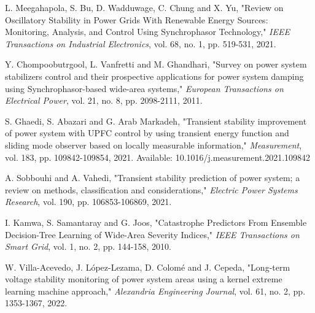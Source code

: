 \begin{thebibliography}{99}
\begin{singlespace}
 L. Meegahapola, S. Bu, D. Wadduwage, C. Chung and X. Yu, "Review on Oscillatory Stability in Power Grids With Renewable Energy Sources: Monitoring, Analysis, and Control Using Synchrophasor Technology," \textit{IEEE Transactions on Industrial Electronics}, vol. 68, no. 1, pp. 519-531, 2021.

 Y. Chompoobutrgool, L. Vanfretti and M. Ghandhari, "Survey on power system stabilizers control and their prospective applications for power system damping using Synchrophasor-based wide-area systems," \textit{European Transactions on Electrical Power}, vol. 21, no. 8, pp. 2098-2111, 2011.

 S. Ghaedi, S. Abazari and G. Arab Markadeh, "Transient stability improvement of power system with UPFC control by using transient energy function and sliding mode observer based on locally measurable information," \textit{Measurement}, vol. 183, pp. 109842-109854, 2021. Available: 10.1016/j.measurement.2021.109842

 A. Sobbouhi and A. Vahedi, "Transient stability prediction of power system; a review on methods, classification and considerations," \textit{Electric Power Systems Research}, vol. 190, pp. 106853-106869, 2021.

 I. Kamwa, S. Samantaray and G. Joos, "Catastrophe Predictors From Ensemble Decision-Tree Learning of Wide-Area Severity Indices," \textit{IEEE Transactions on Smart Grid}, vol. 1, no. 2, pp. 144-158, 2010.

 W. Villa-Acevedo, J. López-Lezama, D. Colomé and J. Cepeda, "Long-term voltage stability monitoring of power system areas using a kernel extreme learning machine approach," \textit{Alexandria Engineering Journal}, vol. 61, no. 2, pp. 1353-1367, 2022.


%
%
%
%




\end{singlespace}
\end{thebibliography}
